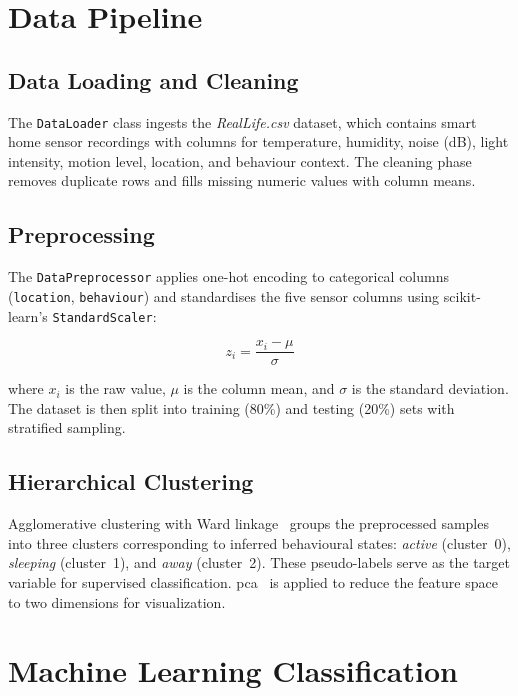 \documentclass[12pt,a4paper,oneside]{report}
\begin{document}
\section{Data Pipeline}
\label{sec:impl-data}

\subsection{Data Loading and Cleaning}

The \texttt{DataLoader} class ingests the \textit{RealLife.csv} dataset, which contains smart home sensor recordings with columns for temperature, humidity, noise (dB), light intensity, motion level, location, and behaviour context. The cleaning phase removes duplicate rows and fills missing numeric values with column means.

\subsection{Preprocessing}

The \texttt{DataPreprocessor} applies one-hot encoding to categorical columns (\texttt{location}, \texttt{behaviour}) and standardises the five sensor columns using scikit-learn's \texttt{StandardScaler}:

\begin{equation}
z_i = \frac{x_i - \mu}{\sigma}
\label{eq:standardscaler}
\end{equation}

\noindent where $x_i$ is the raw value, $\mu$ is the column mean, and $\sigma$ is the standard deviation. The dataset is then split into training (80\%) and testing (20\%) sets with stratified sampling.

\subsection{Hierarchical Clustering}

Agglomerative clustering with Ward linkage~\cite{ward1963hierarchical} groups the preprocessed samples into three clusters corresponding to inferred behavioural states: \textit{active} (cluster~0), \textit{sleeping} (cluster~1), and \textit{away} (cluster~2). These pseudo-labels serve as the target variable for supervised classification. \gls{pca}~\cite{jolliffe2016principal} is applied to reduce the feature space to two dimensions for visualization.


\section{Machine Learning Classification}
\label{sec:impl-classification}
\end{document}
